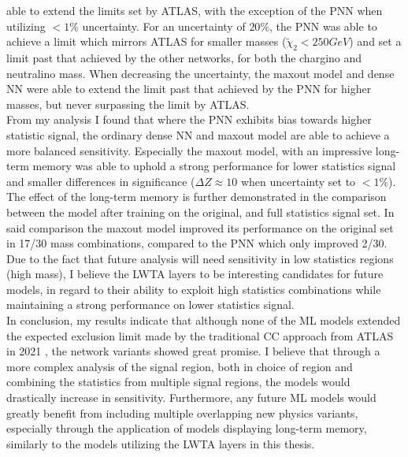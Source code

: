 able to extend the limits set by \ac{ATLAS}, with the exception of the \ac{PNN} when utilizing $<1\%$ uncertainty. For an uncertainty of $20\%$, the \ac{PNN} was able to achieve a limit which mirrors \ac{ATLAS} for smaller masses ($\tilde{\chi}_2<250GeV$)
and set a limit past that achieved by the other networks, for both the chargino and neutralino mass. When decreasing the uncertainty, the maxout model and dense \ac{NN} were able to extend the limit past that achieved by the \ac{PNN} for higher masses, 
but never surpassing the limit by \ac{ATLAS}.
\\\newline
From my analysis I found that where the \ac{PNN} exhibits bias towards higher statistic signal, the ordinary dense \ac{NN} and maxout model are able to achieve a more balanced sensitivity. Especially the 
maxout model, with an impressive long-term memory was able to uphold a strong performance for lower statistics signal and smaller differences in significance ($\Delta Z \approx 10$ when uncertainty set to $<1\%$). The effect of the long-term memory 
is further demonstrated in the comparison between the model after training on the original, and full statistics signal set. In said comparison the maxout model improved its performance on the original set in 17/30 mass combinations, compared to the \ac{PNN} which only improved
2/30. Due to the fact that future analysis will need sensitivity in low statistics regions (high mass), I believe the \ac{LWTA} layers to be interesting candidates for future models, in regard to their ability to exploit high statistics combinations while maintaining a 
strong performance on lower statistics signal. 
\\\newline
In conclusion, my results indicate that although none of the \ac{ML} models extended the expected exclusion limit made by the traditional \ac{CC} approach from \ac{ATLAS} in 2021 \cite{atlas_search_2021}, the network variants showed great promise. I believe
that through a more complex analysis of the signal region, both in choice of region and combining the statistics from multiple signal regions, the models would drastically increase in sensitivity. Furthermore, any future \ac{ML} models would greatly benefit from
including multiple overlapping new physics variants, especially through the application of models displaying long-term memory, similarly to the models utilizing the \ac{LWTA} layers in this thesis.
